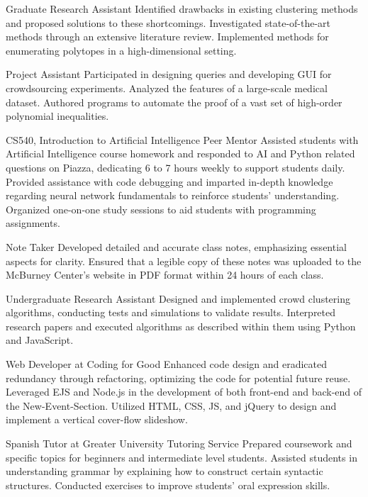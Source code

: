 \documentclass[11pt,letterpaper]{report}
\begin{document}
    \begin{tablist}

    \item[Graduate Research Assistant] \tab{}
        Identified drawbacks in existing clustering methods and proposed solutions to these shortcomings. Investigated state-of-the-art methods through an extensive literature review. Implemented methods for enumerating polytopes in a high-dimensional setting.
    \item[Project Assistant] \tab{} \newline
        Participated in designing queries and developing GUI for crowdsourcing experiments. Analyzed the features of a large-scale medical dataset. Authored programs to automate the proof of a vast set of high-order polynomial inequalities.
    \item[CS540, Introduction to Artificial Intelligence Peer Mentor] \tab{}
        Assisted students with Artificial Intelligence course homework and responded to AI and Python related questions on Piazza, dedicating 6 to 7 hours weekly to support students daily. Provided assistance with code debugging and imparted in-depth knowledge regarding neural network fundamentals to reinforce students' understanding. Organized one-on-one study sessions to aid students with programming assignments.
    \item[Note Taker] \tab{} \newline
      Developed detailed and accurate class notes, emphasizing essential aspects for clarity. Ensured that a legible copy of these notes was uploaded to the McBurney Center’s website in PDF format within 24 hours of each class.
    \item[Undergraduate Research Assistant] \tab{}
      Designed and implemented crowd clustering algorithms, conducting tests and simulations to validate results. Interpreted research papers and executed algorithms as described within them using Python and JavaScript.
    \item[Web Developer at Coding for Good] \tab{}
      Enhanced code design and eradicated redundancy through refactoring, optimizing the code for potential future reuse. Leveraged EJS and Node.js in the development of both front-end and back-end of the New-Event-Section. Utilized HTML, CSS, JS, and jQuery to design and implement a vertical cover-flow slideshow.
    \item[Spanish Tutor at Greater University Tutoring Service] \tab{}
      Prepared coursework and specific topics for beginners and intermediate level students. Assisted students in understanding grammar by explaining how to construct certain syntactic structures. Conducted exercises to improve students' oral expression skills.
    \end{tablist}
\end{document}
